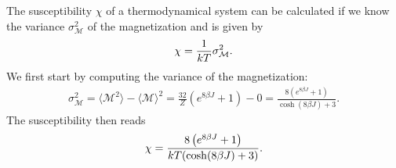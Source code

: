The susceptibility $\chi$ of a thermodynamical system can be calculated if we
know the variance $\sigma_\mathcal{M}^2$ of the magnetization and is given by 
\begin{equation}
  \notag
  \chi = \frac{1}{kT}\sigma_\mathcal{M}^2.
\end{equation}
We first start by computing the variance of the magnetization:
\begin{align*}
  \sigma_\mathcal{M}^2 = \langle \mathcal{M}^2 \rangle - \langle \mathcal{M} \rangle^2 = \frac{32}{Z}\left( e^{8\beta J} + 1 \right) - 0 = \frac{8 \left( e^{8\beta J} + 1 \right)}{\cosh(8\beta J) + 3}.
\end{align*}
The susceptibility then reads
\begin{equation}
  \notag
  \chi = \frac{8 \left( e^{8\beta J} + 1 \right)}{kT(\cosh(8\beta J) + 3)}.
\end{equation}
